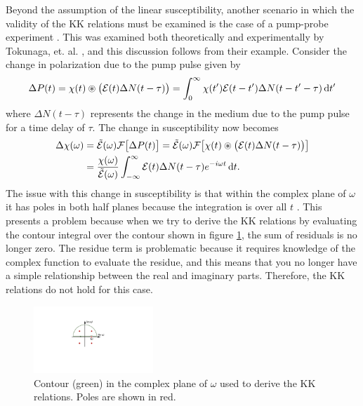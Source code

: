 Beyond the assumption of the linear susceptibility, another scenario in which the validity of the KK relations must be examined is the case of a pump-probe experiment \cite{tokunagaFemtosecondTimeresolvedDispersion1993, tokunagaFemtosecondContinuumInterferometer1996, lucariniKramersKronigRelationsOptical2005}.  This was examined both theoretically and experimentally by Tokunaga, et. al. \cite{tokunagaFemtosecondTimeresolvedDispersion1993, tokunagaFemtosecondContinuumInterferometer1996}, and this discussion follows from their example.  Consider the change in polarization due to the pump pulse given by
\begin{equation}
	\Delta P(t) = \chi(t)\circledast \big( \mathcal{E}(t) \Delta N(t-\tau)\big) = \int_{0}^{\infty}\chi(t')\mathcal{E}(t-t')\Delta N(t - t' - \tau) \mathop{}\!\mathrm{d} t'
\end{equation}
where $\Delta N (t-\tau)$ represents the change in the medium due to the pump pulse for a time delay of $\tau$.  The change in susceptibility now becomes
\begin{equation}
	\label{eqn:d_chi}
	\begin{aligned}
		\Delta\chi(\omega) &= \tilde{\mathcal{E}}(\omega) \mathcal{F}\big[\Delta P(t)\big] = \tilde{\mathcal{E}}(\omega) \mathcal{F}\big[ \chi(t)\circledast \big( \mathcal{E}(t) \Delta N(t-\tau)\big) \big]\\
		& = \frac{\chi(\omega)}{\tilde{\mathcal{E}}(\omega)}\int_{-\infty}^{\infty}\mathcal{E}(t)\Delta N (t-\tau) e^{-i\omega t }\mathop{}\!\mathrm{d} t.
	\end{aligned}
\end{equation}
The issue with this change in susceptibility is that within the complex plane of $\omega$ it has poles in both half planes because the integration is over all $t$ \cite{tokunagaFemtosecondTimeresolvedDispersion1993, tokunagaFemtosecondContinuumInterferometer1996, lucariniKramersKronigRelationsOptical2005}.  This presents a problem because when we try to derive the KK relations by evaluating the contour integral over the contour shown in figure \ref{fig:KK_contour_pump}, the sum of residuals is no longer zero.  The residue term is problematic because it requires knowledge of the complex function to evaluate the residue, and this means that you no longer have a simple relationship between the real and imaginary parts.  Therefore, the KK relations do not hold for this case.

\begin{figure}
	\centering
	\includegraphics[width=0.4\textwidth]{figures/CATS/KK_pump.pdf}
	\caption[Contour used to derive KK relations in the presence of a pump field]{Contour (green) in the complex plane of $\omega$ used to derive the KK relations.  Poles are shown in red.}
	\label{fig:KK_contour_pump}
\end{figure}

